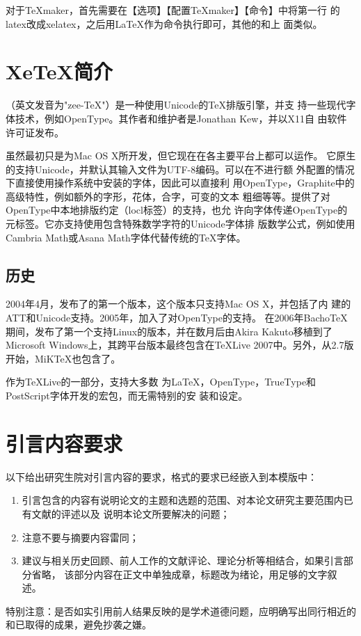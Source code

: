 对于\TeX{}maker，首先需要在【选项】【配置\TeX{}maker】【命令】中将第一行
的latex改成xelatex，之后用\LaTeX{}作为\XeLaTeX{}命令执行即可，其他的和上
面类似。

\section{XeTeX简介}
\XeTeX{}（英文发音为"zee-\TeX{}"）是一种使用Unicode的\TeX{}排版引擎，并支
持一些现代字体技术，例如OpenType。其作者和维护者是Jonathan Kew，并以X11自
由软件许可证发布。

虽然\XeTeX{}最初只是为Mac OS X所开发，但它现在在各主要平台上都可以运作。
它原生的支持Unicode，并默认其输入文件为UTF-8编码。\XeTeX{}可以在不进行额
外配置的情况下直接使用操作系统中安装的字体，因此可以直接利
用OpenType，Graphite中的高级特性，例如额外的字形，花体，合字，可变的文本
粗细等等。\XeTeX{}提供了对OpenType中本地排版约定（locl标签）的支持，也允
许向字体传递OpenType的元标签。它亦支持使用包含特殊数学字符的Unicode字体排
版数学公式，例如使用Cambria Math或Asana Math字体代替传统的\TeX{}字体。


\subsection{历史}
2004年4月，发布了\XeTeX{}的第一个版本，这个版本只支持Mac OS X，并包括了内
建的ATT和Unicode支持。2005年，加入了对OpenType的支持。
在2006年Bacho\TeX{}期间，发布了第一个支持Linux的版本，并在数月后由Akira
Kakuto移植到了Microsoft Windows上，其跨平台版本最终包含在\TeX{}Live
2007中。另外，从2.7版开始，MiK\TeX{}也包含了\XeTeX{}。

作为\TeX{}Live的一部分，\XeTeX{}支持大多数
为\LaTeX{}，OpenType，TrueType和PostScript字体开发的宏包，而无需特别的安
装和设定。


\section{引言内容要求}
以下给出研究生院对引言内容的要求，格式的要求已经嵌入到本模版中：
\begin{enumerate}
\item 引言包含的内容有说明论文的主题和选题的范围、对本论文研究主要范围内已有文献的评述以及
  说明本论文所要解决的问题；
\item 注意不要与摘要内容雷同；
\item 建议与相关历史回顾、前人工作的文献评论、理论分析等相结合，如果引言部分省略，
  该部分内容在正文中单独成章，标题改为绪论，用足够的文字叙述。
\end{enumerate}

\textcolor[rgb]{1.00,0.00,0.00}
{特别注意：是否如实引用前人结果反映的是学术道德问题，应明确写出同行相近的和已取得的成果，避免抄袭之嫌。} 